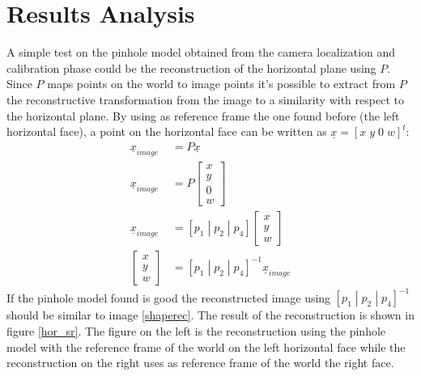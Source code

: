 \documentclass[11pt, oneside]{article}   	%
\begin{document}
\section{Results Analysis}
A simple test on the pinhole model obtained from the camera localization and calibration phase could be the reconstruction of the horizontal plane using $P$.
Since $P$ maps points on the world to image points it's possible to extract from $P$ the reconstructive transformation from the image to a similarity with respect to the horizontal plane.
By using as reference frame the one found before (the left horizontal face), a point on the horizontal face can be written as $\underline{x} = [ x \; y \; 0 \; w]^t$:
\begin{subequations}
\begin{align*}
\underline{x}_{image} &= P\underline{x}  \\
\underline{x}_{image} &= P\begin{bmatrix}
x \\
y \\
0 \\
w
\end{bmatrix} \\
\underline{x}_{image} &= [p_1 \; | \; p_2 \; | \; p_4] \begin{bmatrix}
x \\
y \\
w
\end{bmatrix} \\
\begin{bmatrix}
x \\
y \\
w
\end{bmatrix} &= [p_1 \; |\; p_2\; |\; p_4]^{-1} \underline{x}_{image}
\end{align*}
\end{subequations}
If the pinhole model found is good the reconstructed image using $[p_1 \; |\; p_2\; |\; p_4]^{-1}$ should be similar to image \ref{shaperec}.
The result of the reconstruction is shown in figure \ref{hor_sr}.
The figure on the left is the reconstruction using the pinhole model with the reference frame of the world on the left horizontal face while the reconstruction on the right uses as reference frame of the world the right face.
\end{document}
